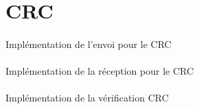 

    \section{CRC}

        \paragraph{}
Implémentation de l'envoi pour le CRC


    \clearpage

        \paragraph{}
Implémentation de la réception pour le CRC


    \clearpage

        \paragraph{}
Implémentation de la vérification CRC


    \clearpage{}
